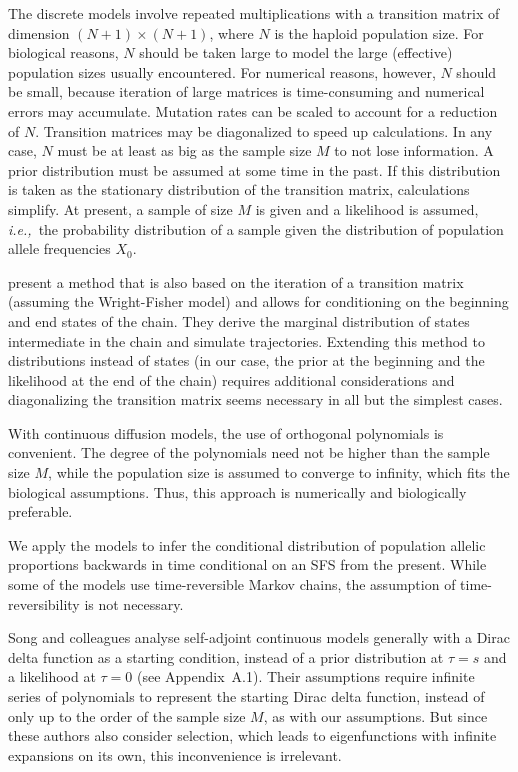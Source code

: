 \documentclass[preprint]{elsarticle}
\newcommand\ie{{\it i.e.,}}
\newcommand\x[1]{\ensuremath{X_{#1}}}
\begin{document}
{The discrete models involve repeated multiplications with a transition matrix of dimension $(N+1)\times(N+1)$, where $N$ is the haploid population size. For biological reasons, $N$ should be taken large to model the large (effective) population sizes usually encountered. For numerical reasons, however, $N$ should be small, because iteration of large matrices is time-consuming and numerical errors may accumulate. Mutation rates can be scaled to account for a reduction of $N$. Transition matrices may be diagonalized to speed up calculations. In any case, $N$ must be at least as big as the sample size $M$ to not lose information. A prior distribution must be assumed at some time in the past. If this distribution is taken as the stationary distribution of the transition matrix, calculations simplify. At present, a sample of size $M$ is given and a likelihood is assumed, \ie\ the probability distribution of a sample given the distribution of population allele frequencies $\x{0}$.

\citet{Zhao14} present a method that is also based on the iteration of a transition matrix (assuming the Wright-Fisher model) and allows for conditioning on the beginning and end states of the chain. They derive the marginal distribution of states intermediate in the chain and simulate trajectories. Extending this method to distributions instead of states (in our case, the prior at the beginning and the likelihood at the end of the chain) requires additional considerations and diagonalizing the transition matrix seems necessary in all but the simplest cases. 

With continuous diffusion models, the use of orthogonal polynomials is convenient. The degree of the polynomials need not be higher than the sample size $M$, while the population size is assumed to converge to infinity, which fits the biological assumptions. Thus, this approach is numerically and biologically preferable. 

We apply the models to infer the conditional distribution of population allelic proportions backwards in time conditional on an SFS from the present. While some of the models use time-reversible Markov chains, the assumption of time-reversibility is not necessary.%

Song and colleagues \citep{Song12,Stei13,Stei14,Zivk15} analyse self-adjoint continuous models generally with a Dirac delta function as a starting condition, instead of a prior distribution at $\tau=s$ and a likelihood at $\tau=0$ (see Appendix~A.1). Their assumptions require infinite series of polynomials to represent the starting Dirac delta function, instead of only up to the order of the sample size $M$, as with our assumptions. But since these authors also consider selection, which leads to eigenfunctions with infinite expansions on its own, this inconvenience is irrelevant. 

}
\end{document}
